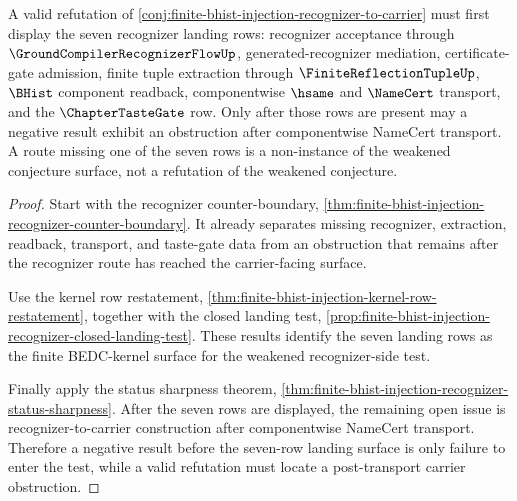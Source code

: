 \begin{theorem}
\label{thm:finite-bhist-injection-recognizer-row-refutation-test}
A valid refutation of \autoref{conj:finite-bhist-injection-recognizer-to-carrier} must first display the seven recognizer landing rows: recognizer acceptance through $\GroundCompilerRecognizerFlowUp$, generated-recognizer mediation, certificate-gate admission, finite tuple extraction through $\FiniteReflectionTupleUp$, $\BHist$ component readback, componentwise $\hsame$ and $\NameCert$ transport, and the $\ChapterTasteGate$ row. Only after those rows are present may a negative result exhibit an obstruction after componentwise NameCert transport. A route missing one of the seven rows is a non-instance of the weakened conjecture surface, not a refutation of the weakened conjecture.
\end{theorem}
\begin{proof}
Start with the recognizer counter-boundary, \autoref{thm:finite-bhist-injection-recognizer-counter-boundary}. It already separates missing recognizer, extraction, readback, transport, and taste-gate data from an obstruction that remains after the recognizer route has reached the carrier-facing surface.

Use the kernel row restatement, \autoref{thm:finite-bhist-injection-kernel-row-restatement}, together with the closed landing test, \autoref{prop:finite-bhist-injection-recognizer-closed-landing-test}. These results identify the seven landing rows as the finite BEDC-kernel surface for the weakened recognizer-side test.

Finally apply the status sharpness theorem, \autoref{thm:finite-bhist-injection-recognizer-status-sharpness}. After the seven rows are displayed, the remaining open issue is recognizer-to-carrier construction after componentwise NameCert transport. Therefore a negative result before the seven-row landing surface is only failure to enter the test, while a valid refutation must locate a post-transport carrier obstruction.
\end{proof}

